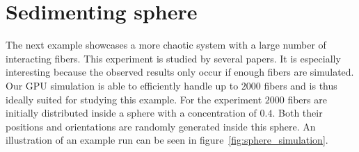 \documentclass[a4paper,11pt]{kth-mag}
\begin{document}
\section{Sedimenting sphere}
\label{sec:example_sphere}

The next example showcases a more chaotic system with a large number of interacting fibers. This experiment is studied by several papers\cite{Metzger2007}\cite{Park2010}. It is especially interesting because the observed results only occur if enough fibers are simulated. Our GPU simulation is able to efficiently handle up to $2000$ fibers and is thus ideally suited for studying this example. For the experiment $2000$ fibers are initially distributed inside a sphere with a concentration of $0.4$. Both their positions and orientations are randomly generated inside this sphere. An illustration of an example run can be seen in figure~\ref{fig:sphere_simulation}.
\end{document}
